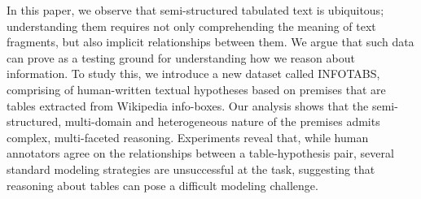 In this paper, we observe that semi-structured tabulated text is ubiquitous; understanding them requires not only comprehending the meaning of text fragments, but also implicit relationships between them. We argue that such data can prove as a testing ground for understanding how we reason about information. To study this, we introduce a new dataset called INFOTABS, comprising of human-written textual hypotheses based on premises that are tables extracted from Wikipedia info-boxes. Our analysis shows that the semi-structured, multi-domain and heterogeneous nature of the premises admits complex, multi-faceted reasoning. Experiments reveal that, while human annotators agree on the relationships between a table-hypothesis pair, several standard modeling strategies are unsuccessful at the task, suggesting that reasoning about tables can pose a difficult modeling challenge.
